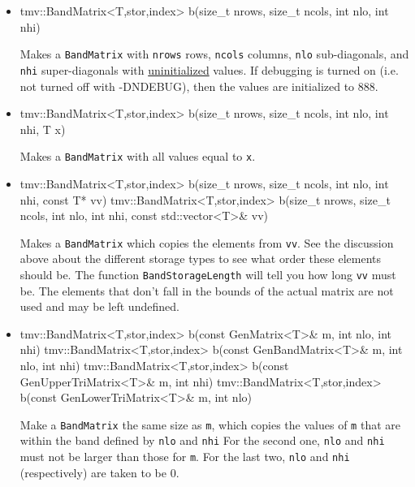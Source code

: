 \documentclass[twoside,letterpaper,11pt]{article}
\renewcommand{\tt}[1]{{\lstinline {#1}}}
\begin{document}
\begin{itemize}
\item 
\begin{tmvcode}
tmv::BandMatrix<T,stor,index> b(size_t nrows, size_t ncols, 
      int nlo, int nhi)
\end{tmvcode}
Makes a \tt{BandMatrix} with \tt{nrows} rows, \tt{ncols} columns, 
\tt{nlo} sub-diagonals,
and \tt{nhi} super-diagonals with \underline{uninitialized} values.
If debugging is turned on (i.e. not turned off 
with -DNDEBUG), then the values are initialized to 888.

\item
\begin{tmvcode}
tmv::BandMatrix<T,stor,index> b(size_t nrows, size_t ncols, 
      int nlo, int nhi, T x)
\end{tmvcode}
Makes a \tt{BandMatrix} with all values equal to \tt{x}.

\item
\begin{tmvcode}
tmv::BandMatrix<T,stor,index> b(size_t nrows, size_t ncols, 
      int nlo, int nhi, const T* vv)
tmv::BandMatrix<T,stor,index> b(size_t nrows, size_t ncols, 
      int nlo, int nhi, const std::vector<T>& vv)
\end{tmvcode}
Makes a \tt{BandMatrix} which copies the elements from \tt{vv}.  See the 
discussion above about the different storage types to see what order these elements
should be.  The function \tt{BandStorageLength} will tell you how
long \tt{vv} must be.  The elements that don't fall in the bounds of the 
actual matrix are not used and may be left undefined.

\item 
\begin{tmvcode}
tmv::BandMatrix<T,stor,index> b(const GenMatrix<T>& m, 
      int nlo, int nhi)
tmv::BandMatrix<T,stor,index> b(const GenBandMatrix<T>& m, 
      int nlo, int nhi)
tmv::BandMatrix<T,stor,index> b(const GenUpperTriMatrix<T>& m,
      int nhi)
tmv::BandMatrix<T,stor,index> b(const GenLowerTriMatrix<T>& m,
      int nlo)
\end{tmvcode}
Make a \tt{BandMatrix} the same size as \tt{m}, which copies the values of \tt{m}
that are within the band defined by \tt{nlo} and \tt{nhi}
For the second one, \tt{nlo} and \tt{nhi} must not be larger than those for \tt{m}.
For the last two, \tt{nlo} and \tt{nhi} (respectively) are taken to be $0$.


\end{itemize}
\end{document}
